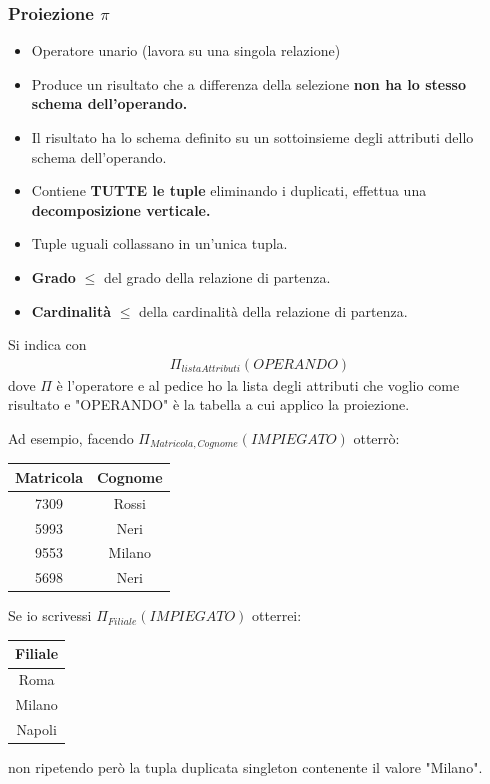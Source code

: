 \documentclass{article}
\begin{document}
\subsubsection{Proiezione $\pi$}
\begin{itemize}
    \item Operatore unario (lavora su una singola relazione)
    \item Produce un risultato che a differenza della selezione \textbf{non ha lo stesso schema dell'operando.}
    \item Il risultato ha lo schema definito su un sottoinsieme degli attributi dello schema dell'operando.
    \item Contiene \textbf{TUTTE le tuple} eliminando i duplicati, effettua una \textbf{decomposizione verticale.}
    \item Tuple uguali collassano in un'unica tupla.
    \item \textbf{Grado} $\boldsymbol{\leq}$ del grado della relazione di partenza.
    \item \textbf{Cardinalità} $\boldsymbol{\leq}$ della cardinalità della relazione di partenza. 
\end{itemize}
Si indica con
    \begin{align*}
        \Pi_{listaAttributi}(OPERANDO)
    \end{align*}
dove $\Pi$ è l'operatore e al pedice ho la lista degli attributi che voglio come risultato e "OPERANDO" è la tabella a cui applico la proiezione.

Ad esempio, facendo $\Pi_{Matricola, Cognome} (IMPIEGATO)$ otterrò:
    \begin{tabular}{|c|c|}
        \hline
        \textbf{Matricola} & \textbf{Cognome} \\
        \hline
        7309 & Rossi \\
        \hline
        5993 & Neri  \\
        \hline
        9553 & Milano \\
        \hline
        5698 & Neri \\
        \hline
    \end{tabular}

Se io scrivessi $\Pi_{Filiale} (IMPIEGATO)$ otterrei: 
    \begin{tabular}{|c|}
        \hline
        \textbf{Filiale} \\
        \hline
        Roma \\
        \hline
        Milano \\
        \hline
        Napoli \\
        \hline
    \end{tabular}
 non ripetendo però la tupla duplicata singleton contenente il valore "Milano".
\end{document}
